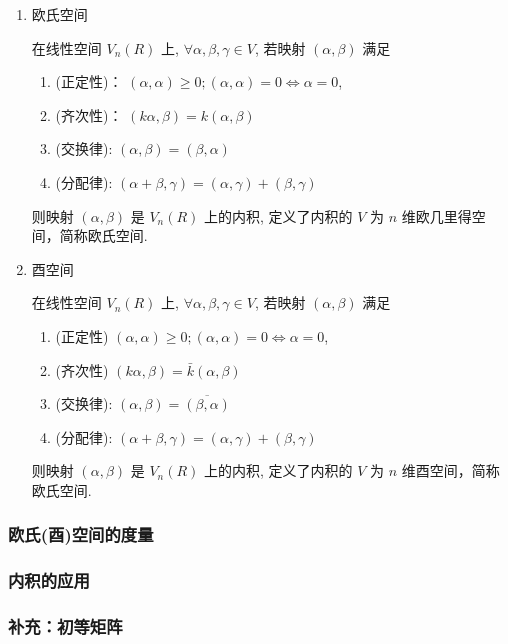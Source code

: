 \begin{enumerate}
\item \textcolor{ecolor}{欧氏空间}
\begin{definition}
	在线性空间 \( V_{n}(R) \) 上, \( \forall \alpha, \beta, \gamma \in V \), 若映射 \( (\alpha, \beta) \) 满足
	\begin{enumerate}
	 \item(正定性)： \( (\alpha, \alpha) \geq 0 ;(\alpha, \alpha)=0 \Leftrightarrow \alpha=0 \),
	\item(齐次性)： \( (k \alpha, \beta)=k(\alpha, \beta) \)
	\item(交换律): \( (\alpha, \beta)=(\beta, \alpha) \)
	\item(分配律): \( (\alpha+\beta, \gamma)=(\alpha, \gamma)+(\beta, \gamma) \)
	\end{enumerate}
	则映射 \( (\alpha, \beta) \) 是 \( V_{n}(R) \) 上的内积, 定义了内积的 \( V \) 为 \( n \) 维欧几里得空间，简称欧氏空间.
\end{definition}

\item \textcolor{ecolor}{酉空间}	
\begin{definition}
	在线性空间 \( V_{n}(R) \) 上, \( \forall \alpha, \beta, \gamma \in V \), 若映射 \( (\alpha, \beta) \) 满足
	\begin{enumerate}
		\item(正定性) \( (\alpha, \alpha) \geq 0 ;(\alpha, \alpha)=0 \Leftrightarrow \alpha=0 \),
		\item(齐次性) \( (k \alpha, \beta)=\bar{k}(\alpha, \beta) \)
		\item(交换律): \( (\alpha, \beta)=\overline{(\beta, \alpha)} \)
		\item(分配律): \( (\alpha+\beta, \gamma)=(\alpha, \gamma)+(\beta, \gamma) \)
	\end{enumerate}
	则映射 \( (\alpha, \beta) \) 是 \( V_{n}(R) \) 上的内积, 定义了内积的 \( V \) 为 \( n \) 维酉空间，简称欧氏空间.
\end{definition}

\end{enumerate}


\subsubsection{欧氏(酉)空间的度量}

\subsubsection{内积的应用}
\subsubsection{补充：初等矩阵}

